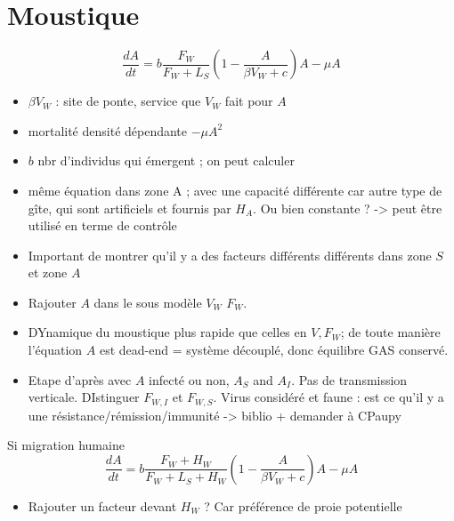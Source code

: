\documentclass{article}
\begin{document}
\section{Moustique}

\begin{equation}
\dfrac{dA}{dt} = b \dfrac{F_W}{F_W + L_S} \left(1 - \dfrac{A}{\beta V_W + c} \right) A - \mu A
\end{equation}
\begin{itemize}
\item $\beta V_W$ : site de ponte, service que $V_W$ fait pour $A$
\item mortalité densité dépendante $ - \mu A^2$
\item $b$ nbr d'individus qui émergent ; on peut calculer
\item même équation dans zone A ; avec une capacité différente car autre type de gîte, qui sont artificiels et fournis par $H_A$. Ou bien constante ? -> peut être utilisé en terme de contrôle
\item Important de montrer qu'il y a des facteurs différents différents dans zone $S$ et zone $A$
\item Rajouter $A$ dans le sous modèle $V_W$ $F_W$.
\item DYnamique du moustique plus rapide que celles en $V,F_W$; de toute manière l'équation $A$ est dead-end = système découplé, donc équilibre GAS conservé.
\item Etape d'après avec $A$ infecté ou non, $A_S$ and $A_I$. Pas de transmission verticale. DIstinguer $F_{W, I}$ et $F_{W, S}$. Virus considéré et faune : est ce qu'il y a une résistance/rémission/immunité -> biblio + demander à CPaupy
\end{itemize}
Si migration humaine 
\begin{equation}
\dfrac{dA}{dt} = b \dfrac{F_W + H_W}{F_W + L_S + H_W} \left(1 - \dfrac{A}{\beta V_W + c} \right) A - \mu A
\end{equation}
\begin{itemize}
\item Rajouter un facteur devant $H_W$ ? Car préférence de proie potentielle
\end{itemize}


\newpage
\end{document}
